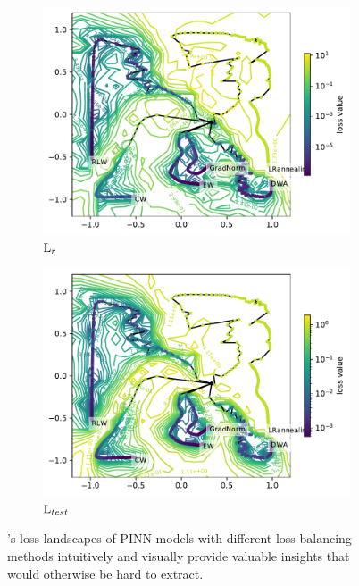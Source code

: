 \documentclass[letterpaper]{article} %
\begin{document}
\begin{figure}[H]
              \begin{subfigure}[b]{0.3\textwidth}
                \includegraphics[width=\textwidth]{figures/round3/MTL2/map_residual_train_loss_loss.pdf}
                \caption{$\text{L}_{r}$}
                \label{subfig:residualAE}
              \end{subfigure}
              \begin{subfigure}[b]{0.3\textwidth}
                \includegraphics[width=\textwidth]{figures/round3/MTL2/map_test_mse_train_loss_loss.pdf}
                \caption{$\text{L}_{test}$}
                            \label{subfig:testAE}
              \end{subfigure}

              \caption{\proposedautencoder{}'s loss landscapes of PINN models with different loss balancing methods intuitively and visually provide valuable insights that would otherwise be hard to extract.}
              \label{fig:dwa}
            \end{figure}
\end{document}
